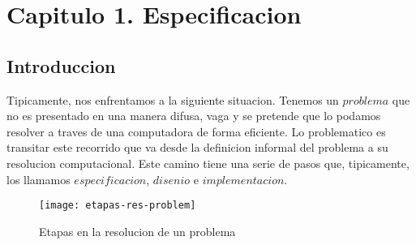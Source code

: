 \documentclass[10pt,a4paper]{article}
\begin{document}
\maketitle

\section{Capitulo 1. Especificacion}

\subsection{Introduccion}

Tipicamente, nos enfrentamos a la siguiente situacion. Tenemos un $problema$ que no es presentado en una manera difusa, vaga y se pretende que lo podamos resolver a traves de una computadora de forma eficiente. Lo problematico es transitar este recorrido que va desde la definicion informal del problema a su resolucion computacional. Este camino tiene una serie de pasos que, tipicamente, los llamamos $especificacion$, $disenio$ e $implementacion$. 

\begin{figure}[h]
	\centering
	\texttt{[image: etapas-res-problem]}
	\caption{Etapas en la resolucion de un problema}
	\label{drivers1}
\end{figure}
\end{document}
